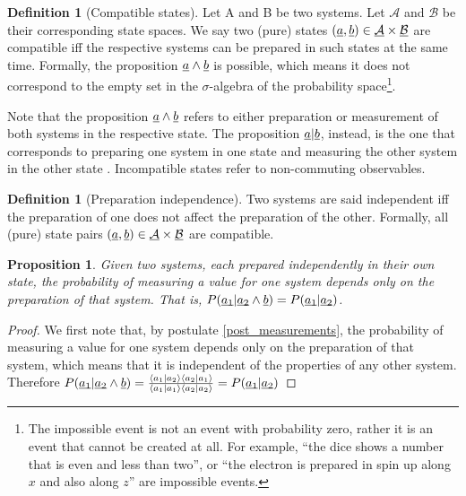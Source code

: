 \documentclass[aps,prl,amsmath,amssymb,twocolumn,nofootinbib]{revtex4}
\theoremstyle{plain}
\newtheorem{prop}[thrm]{Proposition}
\theoremstyle{definition}
\newtheorem{defn}[thrm]{Definition}
\theoremstyle{remark}
\newcommand{\pj}[1] {\underbar{$#1$}}
\def\>{\rangle}
\def\<{\langle}
\begin{document}
\begin{defn}[Compatible states]\label{def_compatible}
  Let A and B be two systems. Let ${\mathcal{A}}$ and ${\mathcal{B}}$
   be their corresponding state spaces. We say two (pure) states $(\pj{a},
  \pj{b}) \in \pj{\mathcal{A}} \times \pj{\mathcal{B}}$ are compatible
  iff the respective systems can be prepared in such states at the
  same time. Formally, the proposition $\pj{a} \wedge \pj{b}$ is
  possible, which means it does not correspond to the empty set in the
  $\sigma$-algebra of the probability space\footnote{The impossible event is not an event with probability zero, rather it is an event that cannot be created at all. For example, ``the dice shows a number that is even and less than two'', or ``the electron is prepared in spin up along $x$ and also along $z$'' are impossible events.}.
\end{defn}

{Note that the proposition $\pj{a} \wedge \pj{b}$ refers to either
  preparation or measurement of both systems  in the respective state.
  The proposition $\pj{a} | \pj{b}$, instead, is the one that
  corresponds to preparing one system in one state and measuring the
  other system in the other state \cite{cox}. Incompatible states
  refer to non-commuting observables.}

\begin{defn}[Preparation independence]\label{def_indep}
Two systems are said independent iff the preparation of one does not affect the preparation of the other. Formally, all (pure) state pairs $(\pj{a}, \pj{b}) \in \pj{\mathcal{A}}\times \pj{\mathcal{B}}$ are compatible.
\end{defn}

\begin{prop}\label{prop_singleBorn}
  Given two systems, each prepared independently in their own state, the probability of measuring a value for one system depends only on the preparation of that system. That is, $P(\pj{a_1}|\pj{a_2}\wedge \pj{b})=P(\pj{a_1}|\pj{a_2})$.
\end{prop}
\begin{proof}
We first note that, by postulate \ref{post_measurements}, the probability of measuring a value for one system depends only on the preparation of that system, which means that it is independent of the properties of any other system. Therefore $P(\pj{a_1} | \pj{a_2} \wedge \pj{b}) = \frac{\<a_1| a_2 \> \< a_2 |a_1\>}{\< a_1 | a_1 \>\< a_2 | a_2 \>} = P(\pj{a_1} | \pj{a_2})$
\end{proof}
\end{document}
